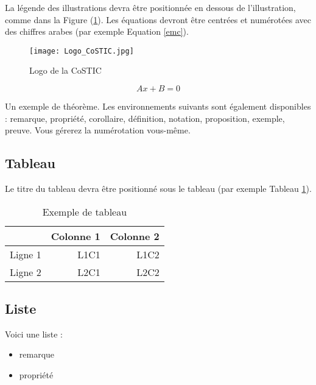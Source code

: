 \documentclass{costic}
\begin{document}
	La légende des illustrations devra être positionnée en dessous de l'illustration, comme dans la Figure (\ref{logoCoSTIC}). Les équations devront être centrées et numérotées avec des chiffres arabes (par exemple Equation \ref{emc}).
	
	\begin{figure}[!ht]
		\begin{center}
			\texttt{[image: Logo\_CoSTIC.jpg]}
			\caption[Fig]{Logo de la CoSTIC}
			\label{logoCoSTIC}
		\end{center}
	\end{figure}
	
	\begin{equation}
		Ax+B=0\label{emc}
	\end{equation}
	
	\begin{theoreme}
		Un exemple de théorème. Les environnements suivants sont également disponibles : remarque, propriété, corollaire, définition, notation, proposition, exemple, preuve. Vous gérerez la numérotation vous-même.
	\end{theoreme}
	
	\subsection{Tableau}
	
	Le titre du tableau devra être positionné sous le tableau (par exemple Tableau \ref{tableau}).
	
	\begin{table}[!ht]
		\begin{center}
			\begin{tabular}{lrr}
				\hline
				& \multicolumn{1}{c}{Colonne 1} & \multicolumn{1}{c}{Colonne 2}\\
				\hline
				Ligne 1 & L1C1 & L1C2\\
				Ligne 2 & L2C1 & L2C2\\
				\hline
			\end{tabular}
			\caption{Exemple de tableau}
			\label{tableau}
		\end{center}
	\end{table}
	
	\subsection{Liste}
	
	Voici une liste :
	
	\begin{itemize}
		\item remarque
		\item propriété
	\end{itemize}
	
\end{document}
